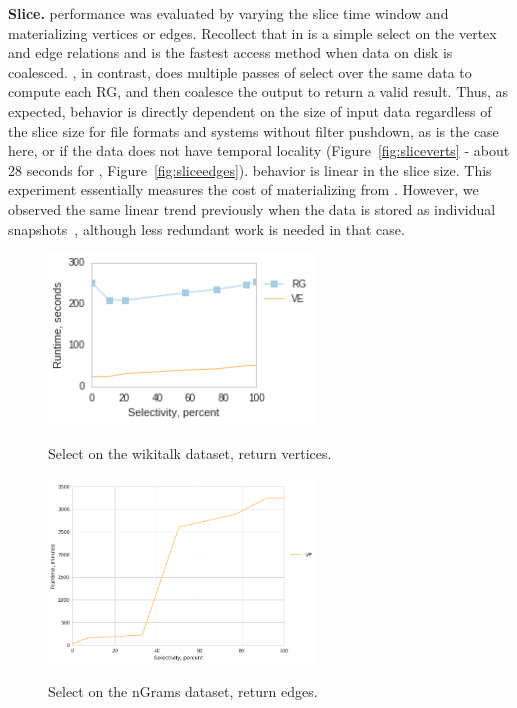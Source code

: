 {\bf Slice.}   performance was evaluated by varying the
slice time window and materializing vertices or edges.  Recollect that
in \ve {} is a simple select on the vertex and edge
relations and is the fastest access method when data on disk is
coalesced.  \sg, in contrast, does multiple passes of select over the
same data to compute each RG, and then coalesce the output to return a
valid result.  Thus, as expected, \ve behavior is directly dependent
on the size of input data regardless of the slice size for file
formats and systems without filter pushdown, as is the case here, or
if the data does not have temporal locality
(Figure~\ref{fig:sliceverts} - about 28 seconds for \ve,
Figure~\ref{fig:sliceedges}).  \sg behavior is linear in the slice
size.  This experiment essentially measures the cost of materializing
\sg from \ve.  However, we observed the same linear trend previously
when the data is stored as individual
snapshots~\cite{PortalarXiv2016}, although less redundant work is
needed in that case.

\begin{figure}
\centering
\begin{minipage}{3.3in}
\centering
\includegraphics[width=2.8in]{figs/select_wikitalk_vertices_build12.png}
\caption{Select on the wikitalk dataset, return vertices.}
\vspace{-0.1in}
\label{fig:selectv}
\vspace{-0.1in}
\end{minipage}
\begin{minipage}{3.3in}
\centering
\includegraphics[width=2.8in]{figs/select_ngrams_edges_build12.png}
\vspace{-0.1in}
\caption{Select on the nGrams dataset, return edges.}
\vspace{-0.1in}
\label{fig:selecte}
\end{minipage}
\end{figure}

